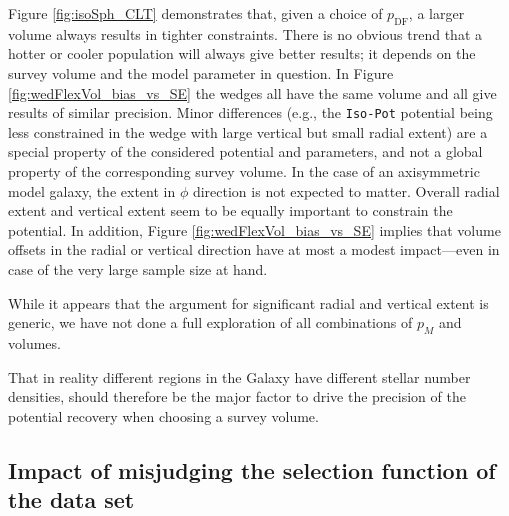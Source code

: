 \documentclass[iop,revtex4]{emulateapj}
\newcommand{\pmodel}{\ensuremath{p_M}}
\begin{document}
Figure \ref{fig:isoSph_CLT} demonstrates that, given a choice of $p_\text{DF}$, a larger volume always results in tighter constraints. There is no obvious trend that a hotter or cooler population will always give better results; it depends on the survey volume and the model parameter in question. In Figure \ref{fig:wedFlexVol_bias_vs_SE} the wedges all have the same volume and all give results of similar precision. Minor differences (e.g., the \texttt{Iso-Pot} potential being less constrained in the wedge with large vertical but small radial extent) are a special property of the considered potential and parameters, and not a global property of the corresponding survey volume. In the case of an axisymmetric model galaxy, the extent in $\phi$ direction is not expected to matter. Overall radial extent and vertical extent seem to be equally important to constrain the potential. In addition, Figure \ref{fig:wedFlexVol_bias_vs_SE} implies that volume offsets in the radial or vertical direction have at most a modest impact---even in case of the very large sample size at hand.

While it appears that the argument for significant radial and vertical extent is generic, we have not done a full exploration of all combinations of \pmodel{} and volumes.

That in reality different regions in the Galaxy have different stellar number densities, should therefore be the major factor to drive the precision of the potential recovery when choosing a survey volume.

\subsection{Impact of misjudging the selection function of the data set} \label{sec:results_incompR}
\end{document}
